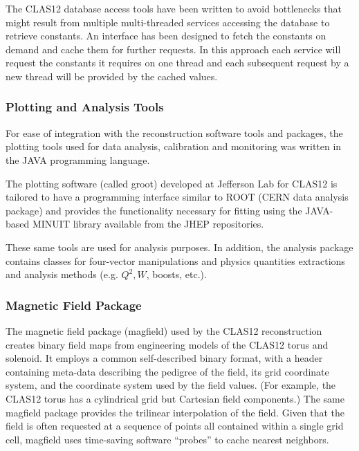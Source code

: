 \documentclass[3p,times,twocolumn]{elsarticle}
\begin{document}
The CLAS12 database access tools have been written to avoid bottlenecks that might result from multiple multi-threaded
services accessing the database to retrieve constants.  An interface has been designed to fetch the constants
on demand and cache them for further requests. In this approach each service will request the
constants it requires on one thread and each subsequent request by a new thread will be provided by the cached values.

\subsubsection{Plotting and Analysis Tools}

For ease of integration with the reconstruction software tools and packages, the plotting tools used for data
analysis, calibration and monitoring was written in the JAVA programming language.

The plotting software (called groot) developed at Jefferson Lab for CLAS12 is tailored to have a programming
interface similar to ROOT
(CERN data analysis package) and provides the functionality necessary for
fitting using the JAVA-based MINUIT library available from the JHEP repositories.

These same tools are used for analysis purposes. In addition, the analysis package
contains classes for four-vector manipulations and physics quantities extractions and
analysis methods (e.g. $Q^2, W$, boosts, etc.).

\subsubsection{Magnetic Field Package}
The magnetic field package (magfield) used by the CLAS12 reconstruction creates
binary field maps from engineering models of the CLAS12 torus and solenoid. It employs
a common self-described binary format, with a header containing meta-data describing
the pedigree of the field, its grid coordinate system, and the coordinate system
used by the field values. (For example, the CLAS12 torus has a cylindrical grid
but Cartesian field components.) The same magfield package provides the trilinear
interpolation of the field. Given that the field is often requested at a sequence
of points all contained within a single grid cell, magfield uses time-saving
software “probes” to cache nearest neighbors.
\end{document}
